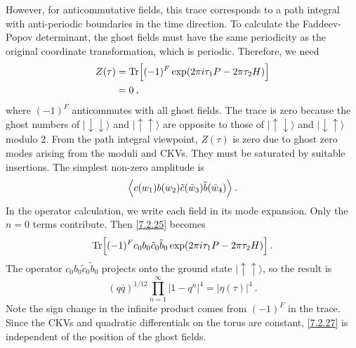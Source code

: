 However, for anticommutative fields, this trace corresponds to a path integral with anti-periodic boundaries in the time direction. To calculate the Faddeev-Popov determinant, the ghost fields must have the same periodicity as the original coordinate transformation, which is periodic. 
Therefore, we need 
\begin{align}
	Z(\tau) &=\operatorname{Tr}\Bigl[(-1)^{F} \exp (2 \pi i \tau_{1} P-2 \pi \tau_{2} H)\Bigr] \nonumber \\
	&=0 \:, \label{7.2.24} 
\end{align}
where $(-1)^{F}$ anticommutes with all ghost fields. 
The trace is zero because the ghost numbers of $\lvert \downarrow \downarrow\rangle$ and $\lvert\uparrow \uparrow\rangle$ are opposite to those of $\lvert \uparrow \downarrow\rangle$ and $\lvert\downarrow \uparrow\rangle$ modulo 2. 
From the path integral viewpoint, $Z(\tau)$ is zero due to ghost zero modes arising from the moduli and CKVs. 
They must be saturated by suitable insertions. The simplest non-zero amplitude is 
\begin{equation}
	\Bigl\langle c(w_{1}) b(w_{2}) \tilde{c}(\bar{w}_{3}) \tilde{b}(\bar{w}_{4})\Bigr\rangle \:. \label{7.2.25} 
\end{equation}
In the operator calculation, we write each field in its mode expansion. Only the $n=0$ terms contribute. 
Then \eqref{7.2.25} becomes 
\begin{equation}
	\operatorname{Tr}\Bigl[(-1)^{F} c_{0} b_{0} \tilde{c}_{0} \tilde{b}_{0} \exp (2 \pi i \tau_{1} P-2 \pi \tau_{2} H)\Bigr] \:. \label{7.2.26} 
\end{equation}
The operator $c_{0} b_{0} \tilde{c}_{0} \tilde{b}_{0}$ projects onto the ground state $\lvert\uparrow \uparrow\rangle$, so the result is 
\begin{equation}
	(q \bar{q})^{1 / 12} \prod_{n=1}^{\infty}|1-q^{n}|^{4}=|\eta(\tau)|^{4} \:. \label{7.2.27} 
\end{equation}
Note the sign change in the infinite product comes from $(-1)^{F}$ in the trace. Since the CKVs and quadratic differentials on the torus are constant, \eqref{7.2.27} is independent of the position of the ghost fields. 

